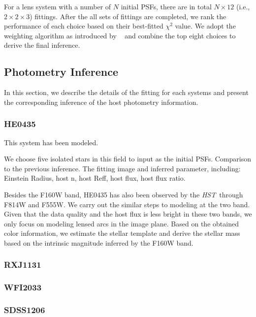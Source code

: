 \documentclass[fleqn,usenatbib]{mnras}
\newcommand{\hst}{{\it HST}}
\begin{document}
For a lens system with a number of $N$ initial PSFs, there are in total $N\times12$ (i.e., $2 \times2 \times3$) fittings. After the all sets of fittings are completed, we rank the performance of each choice based on their best-fitted $\chi^2$ value. We adopt the weighting algorithm as introduced by ~\citet{Ding2020} and combine the top eight choices to derive the final inference.

\subsection{Photometry Inference}
In this section, we describe the details of the fitting for each systems and present the corresponding inference of the host photometry information. 

\subsubsection{HE0435}
This system has been modeled.

We choose five isolated stars in this field to input as the initial PSFs. 
Comparison to the previous inference.
The fitting image and inferred parameter, including: Einstein Radius, host n, host Reff, host flux, host flux ratio.

Besides the F160W band, HE0435 has also been observed by the \hst\ through F814W and F555W. We carry out the similar steps to modeling at the two band. Given that the data quality and the host flux is less bright in these two bands, we only focus on modeling lensed arcs in the image plane. Based on the obtained color information, we estimate the stellar template and derive the stellar mass based on the intrinsic magnitude inferred by the F160W band.

\subsubsection{RXJ1131}

\subsubsection{WFI2033}

\subsubsection{SDSS1206}
\end{document}
